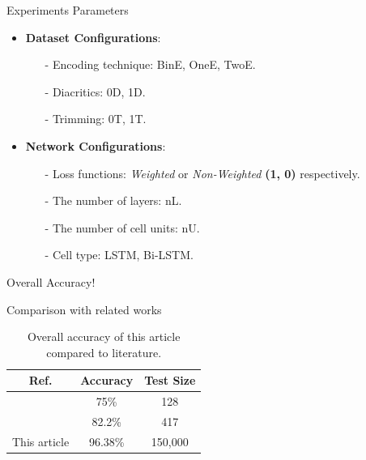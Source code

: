 \begin{frame}[fragile]{Experiments Parameters}
\begin{itemize}
	\item \textbf{Dataset Configurations}:
	\begin{itemize}
		\item [-] Encoding technique: BinE, OneE, TwoE.
		\item [-] Diacritics: 0D, 1D.
		\item [-] Trimming: 0T, 1T.
	\end{itemize}
\item \textbf{Network Configurations}:
\begin{itemize}
\item [-] Loss functions: \textit{Weighted} or \textit{Non-Weighted } \textbf{(1, 0)} respectively.
\item [-] The number of layers: nL.
\item [-] The number of cell units: nU.
\item [-] Cell type: LSTM, Bi-LSTM.
\end{itemize}
\end{itemize}
\end{frame}

\begin{frame}[fragile]{Overall Accuracy!}

\end{frame}


\begin{frame}[fragile]{Comparison with related works}
\begin{table}[h]
	\centering
	\begin{tabular}{c c c}
		\toprule
		\textbf{Ref.}& \textbf{Accuracy}& \textbf{Test Size} \\
		\midrule
		\cite{Alnagdawi2013FindingArabicPoemMeter} & 75\% & 128\\
		\cite{Abuata2016RuleBasedAlgorithm}& 82.2\% & 417\\
		This article & 96.38\%& 150,000 \\
		\bottomrule
	\end{tabular}
	\caption{Overall accuracy of this article compared to literature.}\label{Tab:Summary_Results}
\end{table}
\end{frame}

